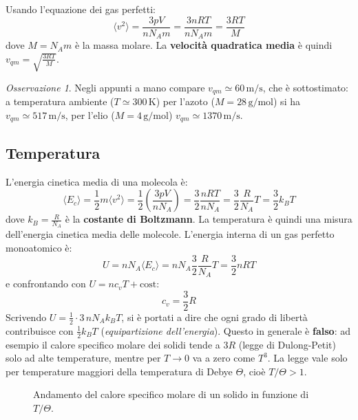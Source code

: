 \documentclass[11pt, a4paper, openright]{book}
\theoremstyle{plain}
\theoremstyle{definition}
\theoremstyle{remark}
\newtheorem{osservazione}[teorema]{Osservazione}
\begin{document}
Usando l'equazione dei gas perfetti:
\begin{equation}
    \langle v^2\rangle = \frac{3pV}{nN_Am} = \frac{3nRT}{nN_Am} = \frac{3RT}{M}
\end{equation}
dove $M = N_Am$ è la massa molare. La \textbf{velocità quadratica media} è quindi $v_{qm} = \sqrt{\frac{3RT}{M}}$.
\begin{osservazione}
    Negli appunti a mano compare $v_{qm} \simeq 60\,\text{m/s}$, che è sottostimato: a temperatura ambiente ($T \simeq 300\,\text{K}$) per l'azoto ($M = 28\,\text{g/mol}$) si ha $v_{qm} \simeq 517\,\text{m/s}$, per l'elio ($M = 4\,\text{g/mol}$) $v_{qm} \simeq 1370\,\text{m/s}$.
\end{osservazione}

\subsection{Temperatura}
L'energia cinetica media di una molecola è:
\begin{equation}
    \langle E_c\rangle = \frac{1}{2}m\langle v^2\rangle = \frac{1}{2}\left(\frac{3pV}{nN_A}\right) = \frac{3}{2}\frac{nRT}{nN_A} = \frac{3}{2}\frac{R}{N_A}T = \frac{3}{2}k_BT
\end{equation}
dove $k_B = \frac{R}{N_A}$ è la \textbf{costante di Boltzmann}. La temperatura è quindi una misura dell'energia cinetica media delle molecole. L'energia interna di un gas perfetto monoatomico è:
\begin{equation}
    U = nN_A\langle E_c\rangle = nN_A\frac{3}{2}\frac{R}{N_A}T = \frac{3}{2}nRT
\end{equation}
e confrontando con $U = nc_vT + \text{cost}$:
\begin{equation}
    c_v = \frac{3}{2}R
\end{equation}
Scrivendo $U = \frac{1}{2}\cdot 3\, nN_Ak_BT$, si è portati a dire che ogni grado di libertà contribuisce con $\frac{1}{2}k_BT$ (\emph{equipartizione dell'energia}). Questo in generale è \textbf{falso}: ad esempio il calore specifico molare dei solidi tende a $3R$ (legge di Dulong-Petit) solo ad alte temperature, mentre per $T \to 0$ va a zero come $T^3$. La legge vale solo per temperature maggiori della temperatura di Debye $\Theta$, cioè $T/\Theta > 1$.

\begin{figure}[H]
    \centering
    \caption{Andamento del calore specifico molare di un solido in funzione di $T/\Theta$.}
\end{figure}
\end{document}
